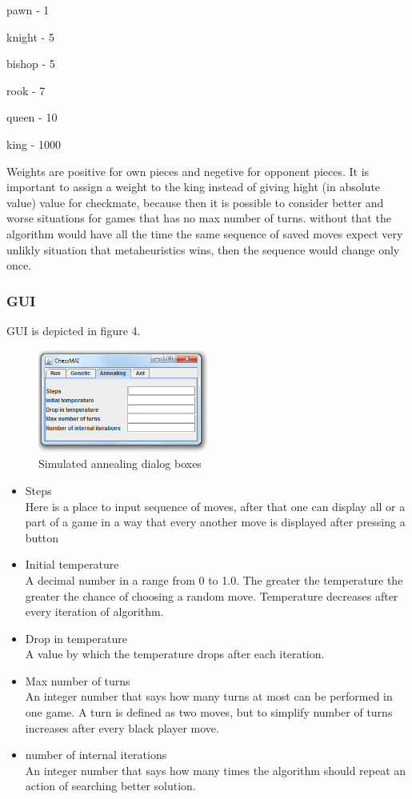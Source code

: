 \documentclass[pdftex]{article}
\begin{document}
pawn - 1

knight - 5

bishop - 5

rook - 7

queen - 10

king - 1000

Weights are positive for own pieces and negetive for opponent pieces.
It is important to assign a weight to the king instead of giving hight (in absolute value) value for checkmate, because then it is possible to consider better and worse situations for games that has no max number of turns. without that the algorithm would have all the time the same sequence of saved moves expect very unlikly situation that metaheuristics wins, then the sequence would change only once.

\subsubsection{GUI}
GUI is depicted in figure 4.
\begin{figure}[!htb]
	\centering
	\includegraphics[width=0.5\textwidth]{annealing/GUI.png} 
	\caption{Simulated annealing dialog boxes}
	\label{fig:annealingTab}
\end{figure}

\begin{itemize}
 	\item Steps \hfill \\
Here is a place to input sequence of moves, after that one can display all or a part of a game in a way that every another move is displayed after pressing  a button

	\item Initial temperature \hfill \\
A decimal number in a range from 0 to 1.0. The greater the temperature the greater the chance of choosing a random move. Temperature decreases after every iteration of algorithm.
 	\item Drop in temperature \hfill \\
A value by which the temperature drops after each iteration.
	\item Max number of turns \hfill \\
An integer number that says how many turns at most can be performed in one game. A turn is defined as two moves, but to simplify number of turns increases after every black player move.
	\item number of internal iterations \hfill \\
An integer number that says how many times the algorithm should repeat an action of searching better solution.
\end{itemize}
\end{document}
